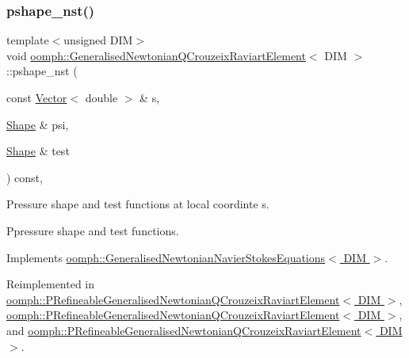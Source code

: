 \mbox{\label{classoomph_1_1GeneralisedNewtonianQCrouzeixRaviartElement_aaf51b44d72cceba2115671c6d99cb38c}} 
\subsubsection{\texorpdfstring{pshape\+\_\+nst()}{pshape\_nst()}\hspace{0.1cm}{\footnotesize\ttfamily [2/4]}}
{\footnotesize\ttfamily template$<$unsigned D\+IM$>$ \\
void \hyperlink{classoomph_1_1GeneralisedNewtonianQCrouzeixRaviartElement}{oomph\+::\+Generalised\+Newtonian\+Q\+Crouzeix\+Raviart\+Element}$<$ D\+IM $>$\+::pshape\+\_\+nst (\begin{DoxyParamCaption}\item[{const \hyperlink{classoomph_1_1Vector}{Vector}$<$ double $>$ \&}]{s,  }\item[{\hyperlink{classoomph_1_1Shape}{Shape} \&}]{psi,  }\item[{\hyperlink{classoomph_1_1Shape}{Shape} \&}]{test }\end{DoxyParamCaption}) const\hspace{0.3cm}{\ttfamily [inline]}, {\ttfamily [virtual]}}



Pressure shape and test functions at local coordinte s. 

Ppressure shape and test functions. 

Implements \hyperlink{classoomph_1_1GeneralisedNewtonianNavierStokesEquations_afb01a54f377b1bebe141ed8e11ced138}{oomph\+::\+Generalised\+Newtonian\+Navier\+Stokes\+Equations$<$ D\+I\+M $>$}.



Reimplemented in \hyperlink{classoomph_1_1PRefineableGeneralisedNewtonianQCrouzeixRaviartElement_a6774455a8d434b26b49c0a4957afa604}{oomph\+::\+P\+Refineable\+Generalised\+Newtonian\+Q\+Crouzeix\+Raviart\+Element$<$ D\+I\+M $>$}, \hyperlink{classoomph_1_1PRefineableGeneralisedNewtonianQCrouzeixRaviartElement_a7d05683bf0896faeb1331a84b0add869}{oomph\+::\+P\+Refineable\+Generalised\+Newtonian\+Q\+Crouzeix\+Raviart\+Element$<$ D\+I\+M $>$}, and \hyperlink{classoomph_1_1PRefineableGeneralisedNewtonianQCrouzeixRaviartElement_a5abe327bf24e7d27f57d72522ea776b8}{oomph\+::\+P\+Refineable\+Generalised\+Newtonian\+Q\+Crouzeix\+Raviart\+Element$<$ D\+I\+M $>$}.



